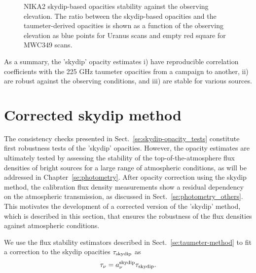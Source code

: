 \begin{figure}[ht!]
\begin{center}
    \caption[NIKA2 skydip-based opacity stability against observing elevations]{NIKA2
    skydip-based opacities stability against the observing elevation. The ratio between the skydip-based opacities and the taumeter-derived opacities is shown as a function of the observing elevation as blue points for Uranus scans and empty red square for MWC349 scans.} 
\label{fig:skydip-to-taumeter-ratio-vs-elev}
\end{center}
\end{figure}

As a summary, the 'skydip' opacity estimates i) have reproducible
correlation coefficients with the 225 GHz taumeter opacities from a
campaign to another, ii) are robust against the observing conditions,
and iii) are stable for various sources. 



\section{Corrected skydip method}%
\label{se:corrected-skydip}

The consistency checks presented in
Sect.~\ref{se:skydip-opacity_tests} constitute first
robustness tests of the 'skydip' opacities. However, the opacity
estimates are ultimately tested by assessing the
stability of the top-of-the-atmosphere flux densities of bright sources for a large
range of atmospheric conditions, as will be addressed in
Chapter~\ref{se:photometry}. After opacity correction using the
skydip method, the calibration flux density measurements show a
residual dependency on the atmospheric transmission, as discussed in
Sect.~\ref{se:photometry_others}. This motivates the development of a
corrected version of the 'skydip' method, which is described in this
section, that ensures the robustness of the flux densities against
atmospheric conditions.


We use the flux stability estimators described in
Sect.~\ref{se:taumeter-method} to fit a correction to the skydip
opacities $\tau_{\rm{skydip}}$ as
\begin{equation}  
  \tau_\nu =  a_\nu^{\rm{skydip}}\tau_{\rm{skydip}}.
  \label{eq:corrected_skydip}
\end{equation}

